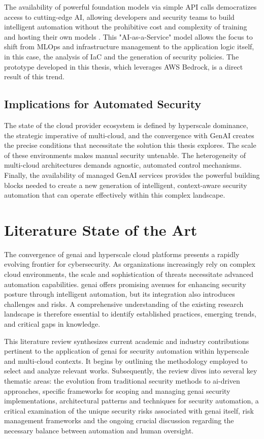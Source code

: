 The availability of powerful foundation models via simple API calls democratizes access to cutting-edge AI, allowing developers and security teams to build intelligent automation without the prohibitive cost and complexity of training and hosting their own models \cite{seth_ai_2025-1}. This "AI-as-a-Service" model allows the focus to shift from MLOps and infrastructure management to the application logic itself, in this case, the analysis of IaC and the generation of security policies. The prototype developed in this thesis, which leverages AWS Bedrock, is a direct result of this trend.

\subsection{Implications for Automated Security}
The state of the cloud provider ecosystem is defined by hyperscale dominance, the strategic imperative of multi-cloud, and the convergence with GenAI creates the precise conditions that necessitate the solution this thesis explores. The scale of these environments makes manual security untenable. The heterogeneity of multi-cloud architectures demands agnostic, automated control mechanisms. Finally, the availability of managed GenAI services provides the powerful building blocks needed to create a new generation of intelligent, context-aware security automation that can operate effectively within this complex landscape.


\section{Literature State of the Art} %
\label{sec:State-of-the-Art}

The convergence of \gls{genai} and hyperscale cloud platforms presents a rapidly evolving frontier for cybersecurity. As organizations increasingly rely on complex cloud environments, the scale and sophistication of threats necessitate advanced automation capabilities. \gls{genai} offers promising avenues for enhancing security posture through intelligent automation, but its integration also introduces challenges and risks. A comprehensive understanding of the existing research landscape is therefore essential to identify established practices, emerging trends, and critical gaps in knowledge.

This literature review synthesizes current academic and industry contributions pertinent to the application of \gls{genai} for security automation within hyperscale and multi-cloud contexts. It begins by outlining the methodology employed to select and analyze relevant works. Subsequently, the review dives into several key thematic areas: the evolution from traditional security methods to \gls{ai}-driven approaches, specific frameworks for scoping and managing \gls{genai} security implementations, architectural patterns and techniques for security automation, a critical examination of the unique security risks associated with \gls{genai} itself, risk management frameworks and the ongoing crucial discussion regarding the necessary balance between automation and human oversight.

